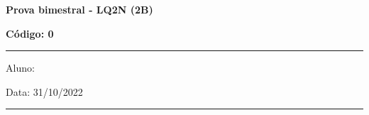 \documentclass[12pt, addpoints]{exam}
\begin{document}
        \begin{minipage}[l]{0.75\linewidth}
            \begin{flushleft}
                {\bf \Large Prova bimestral - LQ2N (2B)}
            \end{flushleft}
        \end{minipage}
        \begin{minipage}[r]{0.20\linewidth}
            \begin{flushright}
                {\bf \Large Código: 0}
            \end{flushright}
        \end{minipage}
        \vspace{0.5cm} \hrule \vspace{0.5cm}
        \begin{minipage}{0.75\linewidth}
            Aluno:
        \end{minipage}
        \begin{minipage}{0.20\linewidth}
            Data: 31/10/2022
        \end{minipage}
        \vspace{0.5cm} \hrule \vspace{0.5cm}
        \begin{center}
            \cellwidth{2.2em}
            \gradetable[h][questions]
        \end{center}
\end{document}
